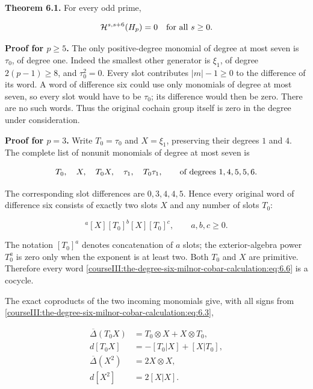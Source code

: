 \textbf{Theorem 6.1.} For every odd prime,

\begin{equation}
\mathcal H^{s,s+6}(H_p)=0\quad\hbox{for all }s\geq0.
 \label{courseIII:the-degree-six-milnor-cobar-calculation:eq:6.4}
\end{equation}

\textbf{Proof for \(p\geq5\).} The only positive-degree monomial of degree at most seven is \(\tau_0\), of degree one. Indeed the smallest other generator is \(\xi_1\), of degree \(2(p-1)\geq8\), and \(\tau_0^2=0\). Every slot contributes \(|m|-1\geq0\) to the difference of its word. A word of difference six could use only monomials of degree at most seven, so every slot would have to be \(\tau_0\); its difference would then be zero. There are no such words. Thus the original cochain group itself is zero in the degree under consideration.

\textbf{Proof for \(p=3\).} Write \(T_0=\tau_0\) and \(X=\xi_1\), preserving their degrees \(1\) and \(4\). The complete list of nonunit monomials of degree at most seven is

\begin{equation}
T_0,\quad X,\quad T_0X,\quad\tau_1,\quad T_0\tau_1,
 \qquad\hbox{of degrees }1,4,5,5,6.
 \label{courseIII:the-degree-six-milnor-cobar-calculation:eq:6.5}
\end{equation}

The corresponding slot differences are \(0,3,4,4,5\). Hence every original word of difference six consists of exactly two slots \(X\) and any number of slots \(T_0\):

\begin{equation}
[T_0]^{a}[X][T_0]^{b}[X][T_0]^{c},
 \qquad a,b,c\geq0.
 \label{courseIII:the-degree-six-milnor-cobar-calculation:eq:6.6}
\end{equation}

The notation \([T_0]^a\) denotes concatenation of \(a\) slots; the exterior-algebra power \(T_0^a\) is zero only when the exponent is at least two. Both \(T_0\) and \(X\) are primitive. Therefore every word \eqref{courseIII:the-degree-six-milnor-cobar-calculation:eq:6.6} is a cocycle.

The exact coproducts of the two incoming monomials give, with all signs from \eqref{courseIII:the-degree-six-milnor-cobar-calculation:eq:6.3},

\begin{equation}
\begin{aligned}
 \overline\Delta(T_0X)&=T_0\otimes X+X\otimes T_0,\\
 d[T_0X]&=-[T_0|X]+[X|T_0],\\
 \overline\Delta(X^2)&=2X\otimes X,\\
 d[X^2]&=2[X|X].
\end{aligned}
\label{courseIII:the-degree-six-milnor-cobar-calculation:eq:6.7}
\end{equation}


